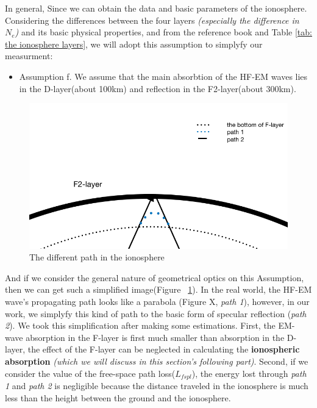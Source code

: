 \documentclass{mcmthesis}
\begin{document}
    In general, Since we can obtain the data and basic parameters of the ionosphere. Considering the differences between the four layers \emph{(especially the difference in $N_{e}$)} and its basic physical properties, and from the reference book\cite{davies1990ionospheric,terman1943radio} and Table \ref{tab: the ionosphere layers}, we will adopt this assumption to simplyfy our measurment:

    \begin{itemize}
      \item Assumption f. We assume that the main absorbtion of the HF-EM waves lies in the D-layer(about 100km) and reflection in the F2-layer(about 300km).
    \end{itemize}

    \begin{figure}[ht]
    \centering
    \includegraphics[scale=0.5]{PathinIonosphere}
    \caption{The different path in the ionosphere}
    \label{fig:PathinIonosphere}
    \end{figure}

    And if we consider the general nature of geometrical optics on this Assumption, then we can get such a simplified image(Figure ~\ref{fig:PathinIonosphere}). In the real world, the HF-EM wave's propagating path looks like a parabola (Figure X, \emph{path 1}), however, in our work, we simplyfy this kind of path to the basic form of specular reflection (\emph{path 2}). We took this simplification after making some estimations. First, the EM-wave absorption in the F-layer is first much smaller than absorption in the D-layer, the effect of the F-layer can be neglected in calculating the \textbf{ionospheric absorption} \emph{(which we will discuss in this section's following part)}. Second, if we consider the value of the free-space path loss($L_{fspl}$), the energy lost through \emph{path 1} and \emph{path 2} is negligible because the distance traveled in the ionosphere is much less than the height between the ground and the ionosphere.
\end{document}
